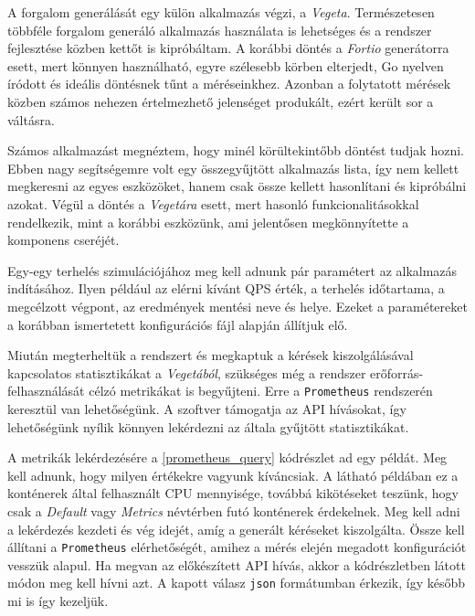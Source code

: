 \lstset{caption=Mérés konfigurációja, label=measurement_config}


A forgalom generálását egy külön alkalmazás végzi, a \textit{Vegeta}\citep{vegetaGithub}. 
Természetesen többféle forgalom generáló alkalmazás használata is lehetséges és a rendszer fejlesztése közben kettőt is kipróbáltam.
A korábbi döntés a \textit{Fortio} generátorra esett, mert könnyen használható, egyre szélesebb körben elterjedt, Go nyelven íródott és ideális döntésnek tűnt a méréseinkhez.
Azonban a folytatott mérések közben számos nehezen értelmezhető jelenséget produkált, ezért került sor a váltásra. 

Számos alkalmazást megnéztem, hogy minél körültekintőbb döntést tudjak hozni. 
Ebben nagy segítségemre volt egy összegyűjtött alkalmazás lista\citep{benchmarkToolsList}, így nem kellett megkeresni az egyes eszközöket, hanem csak össze kellett hasonlítani és kipróbálni azokat.
Végül a döntés a \textit{Vegetára} esett, mert hasonló funkcionalitásokkal rendelkezik, mint a korábbi eszközünk, ami jelentősen megkönnyítette a komponens cseréjét.

Egy-egy terhelés szimulációjához meg kell adnunk pár paramétert az alkalmazás indításához. 
Ilyen például az elérni kívánt QPS érték, a terhelés időtartama, a megcélzott végpont, az eredmények mentési neve és helye.
Ezeket a paramétereket a korábban ismertetett konfigurációs fájl alapján állítjuk elő.

%

Miután megterheltük a rendszert és megkaptuk a kérések kiszolgálásával kapcsolatos statisztikákat a \textit{Vegetából}, szükséges még a rendszer erőforrás-felhasználását célzó metrikákat is begyűjteni. 
Erre a \verb+Prometheus+ rendszerén keresztül van lehetőségünk.
A szoftver támogatja az API hívásokat, így lehetőségünk nyílik könnyen lekérdezni az általa gyűjtött statisztikákat. 

A metrikák lekérdezésére a \ref{prometheus_query} kódrészlet ad egy példát. Meg kell adnunk, hogy milyen értékekre vagyunk kíváncsiak. 
A látható példában ez a konténerek által felhasznált CPU mennyisége, továbbá kikötéseket teszünk, hogy csak a \textit{Default} vagy \textit{Metrics} névtérben futó konténerek érdekelnek.
Meg kell adni a lekérdezés kezdeti és vég idejét, amíg a generált kéréseket kiszolgálta.
Össze kell állítani a \verb+Prometheus+ elérhetőségét, amihez a mérés elején megadott konfigurációt vesszük alapul. Ha megvan az előkészített API hívás, akkor a kódrészletben látott módon meg kell hívni azt.
A kapott válasz \verb+json+ formátumban érkezik, így később mi is így kezeljük. \\


